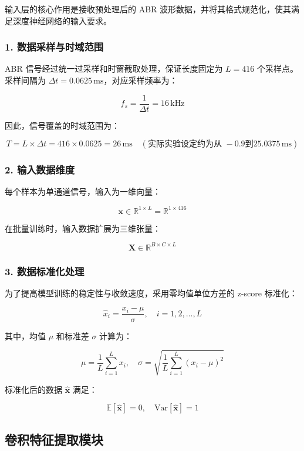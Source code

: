 输入层的核心作用是接收预处理后的 ABR 波形数据，并将其格式规范化，使其满足深度神经网络的输入要求。

\subsubsection{1. 数据采样与时域范围}

ABR 信号经过统一过采样和时窗截取处理，保证长度固定为 \( L = 416 \) 个采样点。采样间隔为 \(\Delta t = 0.0625\,\mathrm{ms}\)，对应采样频率为：

\[
f_s = \frac{1}{\Delta t} = 16\,\mathrm{kHz}
\]

因此，信号覆盖的时域范围为：

\[
T = L \times \Delta t = 416 \times 0.0625 = 26\,\mathrm{ms} \quad (\text{实际实验设定约为从 } -0.9 \text{到} 25.0375\,\mathrm{ms})
\]

\subsubsection*{2. 输入数据维度}

每个样本为单通道信号，输入为一维向量：

\[
\mathbf{x} \in \mathbb{R}^{1 \times L} = \mathbb{R}^{1 \times 416}
\]

在批量训练时，输入数据扩展为三维张量：

\[
\mathbf{X} \in \mathbb{R}^{B \times C \times L}
\]

\subsubsection*{3. 数据标准化处理}

为了提高模型训练的稳定性与收敛速度，采用零均值单位方差的 z-score 标准化：

\[
\hat{x}_i = \frac{x_i - \mu}{\sigma}, \quad i=1,2,\ldots,L
\]

其中，均值 \(\mu\) 和标准差 \(\sigma\) 计算为：

\[
\mu = \frac{1}{L} \sum_{i=1}^L x_i, \quad \sigma = \sqrt{\frac{1}{L} \sum_{i=1}^L (x_i - \mu)^2}
\]

标准化后的数据 \(\hat{\mathbf{x}}\) 满足：

\[
\mathbb{E}[\hat{\mathbf{x}}] = 0, \quad \mathrm{Var}[\hat{\mathbf{x}}] = 1
\]


\subsection*{卷积特征提取模块}

